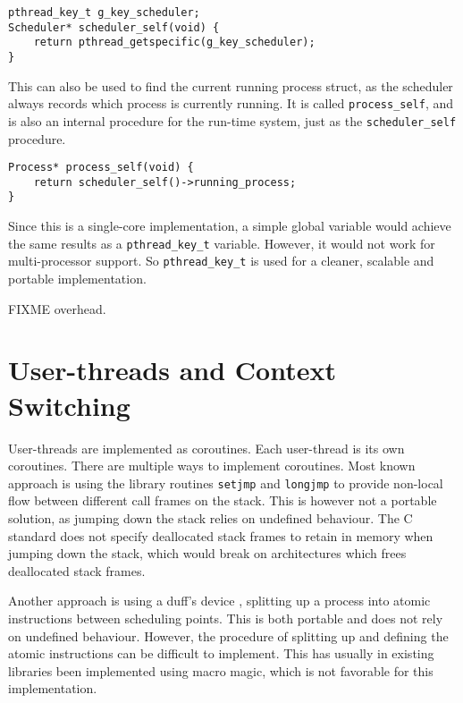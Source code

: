 \begin{lstlisting}[style={CustomC},caption={Procedure to find the scheduler for a given kernel\hyp{}trhead}]
pthread_key_t g_key_scheduler;
Scheduler* scheduler_self(void) {
    return pthread_getspecific(g_key_scheduler);
}
\end{lstlisting}

This can also be used to find the current running process struct, as the scheduler always records which process is currently running. It is called \texttt{process\_self}, and is also an internal procedure for the run\hyp{}time system, just as the \texttt{scheduler\_self} procedure.

\begin{lstlisting}[style={CustomC},caption={Procedure to find the current running process}]
Process* process_self(void) {
    return scheduler_self()->running_process;
}
\end{lstlisting}

Since this is a single\hyp{}core implementation, a simple global variable would achieve the same results as a \texttt{pthread\_key\_t} variable. However, it would not work for multi\hyp{}processor support. So \texttt{pthread\_key\_t} is used for a cleaner, scalable and portable implementation.

FIXME overhead.

\section{User\hyp{}threads and Context Switching}

User\hyp{}threads are implemented as coroutines. Each user\hyp{}thread is its own coroutines. There are multiple ways to implement coroutines. Most known approach is using the library routines \texttt{setjmp} and \texttt{longjmp} to provide non\hyp{}local flow between different call frames on the stack. This is however not a portable solution, as jumping down the stack relies on undefined behaviour. The C standard does not specify deallocated stack frames to retain in memory when jumping down the stack, which would break on architectures which frees deallocated stack frames.

Another approach is using a duff's device \citep{duffsdevice}, splitting up a process into atomic instructions between scheduling points. This is both portable and does not rely on undefined behaviour. However, the procedure of splitting up and defining the atomic instructions can be difficult to implement. This has usually in existing libraries been implemented using macro magic, which is not favorable for this implementation.

